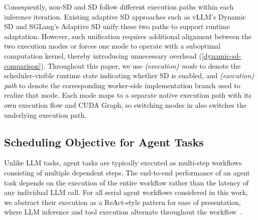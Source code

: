 Consequently, non-SD and SD follow different execution paths within each inference iteration. Existing adaptive SD approaches such as vLLM's Dynamic SD and SGLang's Adaptive SD unify these two paths to support runtime adaptation. However, such unification requires additional alignment between the two execution modes or forces one mode to operate with a suboptimal computation kernel, thereby introducing unnecessary overhead (\autoref{dynamic-sd-comparison}).
Throughout this paper, we use {\em (execution) mode} to denote the scheduler-visible runtime state indicating whether SD is enabled, and {\em (execution) path} to denote the corresponding worker-side implementation branch used to realize that mode. Each mode maps to a separate native execution path with its own execution flow and CUDA Graph, so switching modes in \sysname also switches the underlying execution path.

\subsection{Scheduling Objective for Agent Tasks}

Unlike LLM tasks, agent tasks are typically executed as multi-step workflows consisting of multiple dependent steps. The end-to-end performance of an agent task depends on the execution of the entire workflow rather than the latency of any individual LLM call. 
For all serial agent workflows considered in this work, we abstract their execution as a ReAct-style pattern for ease of presentation, where LLM inference and tool execution alternate throughout the workflow~\citep{ReAct}. 

